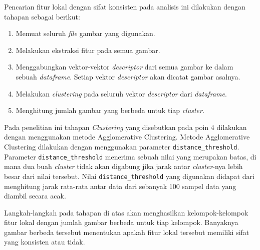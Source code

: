 Pencarian fitur lokal dengan sifat konsisten pada analisis ini dilakukan dengan tahapan sebagai berikut:
\begin{enumerate}
	\item Memuat seluruh \textit{file} gambar yang digunakan.
	\item Melakukan ekstraksi fitur pada semua gambar.
	\item Menggabungkan vektor-vektor \textit{descriptor} dari semua gambar ke dalam sebuah \textit{dataframe}. Setiap vektor \textit{descriptor} akan dicatat gambar asalnya.
	\item Melakukan \textit{clustering} pada seluruh vektor \textit{descriptor} dari \textit{dataframe}.
	\item Menghitung jumlah gambar yang berbeda untuk tiap \textit{cluster}.
\end{enumerate}
Pada penelitian ini tahapan \textit{Clustering} yang disebutkan pada poin 4 dilakukan dengan menggunakan metode Agglomerative Clustering. Metode Agglomerative Clustering dilakukan dengan menggunakan parameter \texttt{distance\_threshold}. Parameter \texttt{distance\_threshold} menerima sebuah nilai yang merupakan batas, di mana dua buah \textit{cluster} tidak akan digabung jika jarak antar \textit{cluster}-nya lebih besar dari nilai tersebut. Nilai \texttt{distance\_threshold} yang digunakan didapat dari menghitung jarak rata-rata antar data dari sebanyak 100 sampel data yang diambil secara acak.

Langkah-langkah pada tahapan di atas akan menghasilkan kelompok-kelompok fitur lokal dengan jumlah gambar berbeda untuk tiap kelompok. Banyaknya gambar berbeda tersebut menentukan apakah fitur lokal tersebut memiliki sifat yang konsisten atau tidak. 

